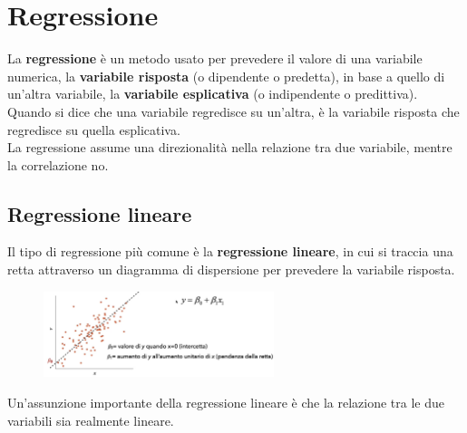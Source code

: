 \documentclass[10pt, draft]{book}
\begin{document}
\chapter{Regressione}

La \textbf{regressione} è un metodo usato per prevedere il valore di una variabile numerica, la \textbf{variabile risposta} (o dipendente o predetta), in base a quello di un'altra variabile, la \textbf{variabile esplicativa} (o indipendente o predittiva).\\
Quando si dice che una variabile regredisce su un'altra, è la variabile risposta che regredisce su quella esplicativa.\\
La regressione assume una direzionalità nella relazione tra due variabile, mentre la correlazione no.

\section{Regressione lineare}

Il tipo di regressione più comune è la \textbf{regressione lineare}, in cui si traccia una retta attraverso un diagramma di dispersione per prevedere la variabile risposta.\\
\begin{figure}[H]
    \centering
    \includegraphics[width=0.6\textwidth]{figretta}
    \caption{\small{}}
    \label{figretta}
\end{figure}
Un'assunzione importante della regressione lineare è che la relazione tra le due variabili sia realmente lineare.
\end{document}
